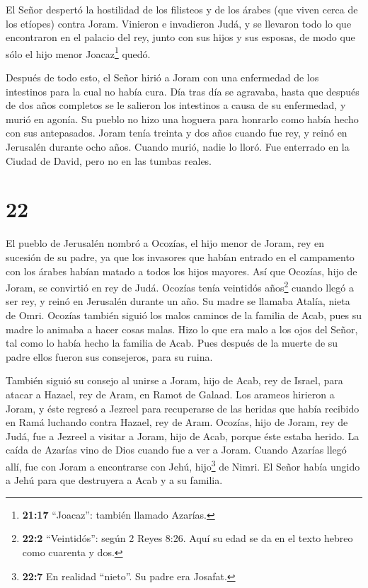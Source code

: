  El Señor despertó la hostilidad de los filisteos y de los
árabes (que viven cerca de los etíopes) contra Joram. 
Vinieron e invadieron Judá, y se llevaron todo lo que encontraron en el
palacio del rey, junto con sus hijos y sus esposas, de modo que sólo el
hijo menor Joacaz\footnote{\textbf{21:17} ``Joacaz'': también llamado
  Azarías.} quedó.

 Después de todo esto, el Señor hirió a Joram con una
enfermedad de los intestinos para la cual no había cura. 
Día tras día se agravaba, hasta que después de dos años completos se le
salieron los intestinos a causa de su enfermedad, y murió en agonía. Su
pueblo no hizo una hoguera para honrarlo como había hecho con sus
antepasados.  Joram tenía treinta y dos años cuando fue
rey, y reinó en Jerusalén durante ocho años. Cuando murió, nadie lo
lloró. Fue enterrado en la Ciudad de David, pero no en las tumbas
reales.

\hypertarget{section-21}{%
\section{22}\label{section-21}}

 El pueblo de Jerusalén nombró a Ocozías, el hijo menor de
Joram, rey en sucesión de su padre, ya que los invasores que habían
entrado en el campamento con los árabes habían matado a todos los hijos
mayores. Así que Ocozías, hijo de Joram, se convirtió en rey de Judá.
 Ocozías tenía veintidós años\footnote{\textbf{22:2}
  ``Veintidós'': según 2 Reyes 8:26. Aquí su edad se da en el texto
  hebreo como cuarenta y dos.} cuando llegó a ser rey, y reinó en
Jerusalén durante un año. Su madre se llamaba Atalía, nieta de Omri.
 Ocozías también siguió los malos caminos de la familia de
Acab, pues su madre lo animaba a hacer cosas malas.  Hizo lo
que era malo a los ojos del Señor, tal como lo había hecho la familia de
Acab. Pues después de la muerte de su padre ellos fueron sus consejeros,
para su ruina.

 También siguió su consejo al unirse a Joram, hijo de Acab,
rey de Israel, para atacar a Hazael, rey de Aram, en Ramot de Galaad.
Los arameos hirieron a Joram,  y éste regresó a Jezreel para
recuperarse de las heridas que había recibido en Ramá luchando contra
Hazael, rey de Aram. Ocozías, hijo de Joram, rey de Judá, fue a Jezreel
a visitar a Joram, hijo de Acab, porque éste estaba herido. 
La caída de Azarías vino de Dios cuando fue a ver a Joram. Cuando
Azarías llegó allí, fue con Joram a encontrarse con Jehú,
hijo\footnote{\textbf{22:7} En realidad ``nieto''. Su padre era Josafat.}
de Nimri. El Señor había ungido a Jehú para que destruyera a Acab y a su
familia.

